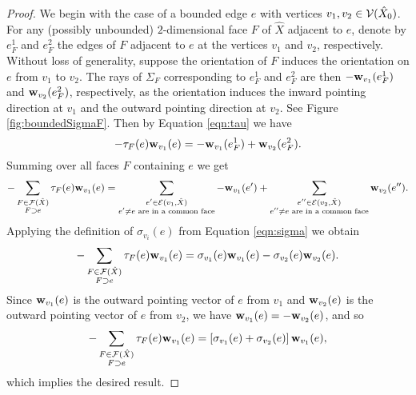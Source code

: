 \begin{proof} 
We begin with the case of a bounded edge $e$ with vertices $v_1, v_2 \in {\mathcal V}(\hat X_0)$.
For any (possibly unbounded) $2$-dimensional face $F$ of $\hat X$ adjacent to $e$,
denote by $e_F^1$ and $e_F^2$ the edges of $F$ adjacent to $e$ at the vertices $v_1$ and $v_2$, respectively. 
Without loss of generality, suppose the orientation of $F$ 
induces the orientation on $e$ from $v_1$ to $v_2$.
The rays of $\Sigma_F$ corresponding to $e_F^1$ and $e_F^2$ are then 
$-\mathbf w_{v_1}(e_F^1)$ and $\mathbf w_{v_2}(e_F^2)$, respectively, as the orientation induces the inward pointing direction at $v_1$ and the outward pointing direction at $v_2$. See Figure \ref{fig:boundedSigmaF}. Then by Equation \eqref{eqn:tau} we have 
$$- \tau_F(e)\mathbf w_{v_1}(e)  = -\mathbf w_{v_1}(e_F^1) + \mathbf w_{v_2}(e_F^2).$$
Summing over all faces $F$ containing $e$ we get
$$
 - \sum_{\substack{F \in {{\mathcal F}}(\hat{X}) \\ F \supset e}} \tau_F(e) \mathbf w_{v_1}(e)  = 
\sum_{\substack{ e' \in {{\mathcal E}}(v_1, \hat{X}) \\ e'\neq e \text{ are in a common face}}} -\mathbf w_{v_1}(e') + \sum_{\substack{ e'' \in {{\mathcal E}}(v_2, \hat{X}) \\e''\neq e \text{ are in a common face}}}  \mathbf w_{v_2}(e'').
$$
Applying the definition of $\sigma_{v_i}(e)$ from Equation \eqref{eqn:sigma} we obtain 
$$- \sum_{\substack{F \in {{\mathcal F}}(\hat{X}) \\ F \supset e}} \tau_F(e) \mathbf w_{v_1}(e)  = \sigma_{v_1}(e) \mathbf w_{v_1}(e)  - \sigma_{v_2}(e) \mathbf w_{v_2}(e).$$ 
Since $\mathbf w_{v_1}(e)$ is the outward pointing vector of $e$ from $v_1$ and $\mathbf w_{v_2}(e)$ is the outward pointing vector of $e$ from $v_2$, we have $\mathbf w_{v_1}(e)  = - \mathbf w_{v_2}(e)$, 
and so
$$  - \sum_{\substack{F \in {{\mathcal F}}(\hat{X}) \\ F \supset e}} \tau_F(e) \mathbf w_{v_1}(e)  = [\sigma_{v_1}(e) + \sigma_{v_2}(e)] \, \mathbf w_{v_1}(e),$$
which implies the desired result.



\end{proof}

